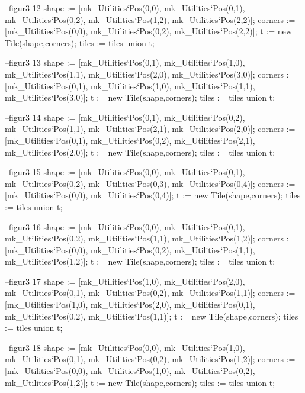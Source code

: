 \begin{vdm_al}
            --figur3 12
            shape := [mk_Utilities`Pos(0,0), mk_Utilities`Pos(0,1), mk_Utilities`Pos(0,2), mk_Utilities`Pos(1,2), mk_Utilities`Pos(2,2)];
            corners := [mk_Utilities`Pos(0,0), mk_Utilities`Pos(0,2), mk_Utilities`Pos(2,2)];
            t := new Tile(shape,corners); 
            tiles := tiles union {t};
            
            --figur3 13
            shape := [mk_Utilities`Pos(0,1), mk_Utilities`Pos(1,0), mk_Utilities`Pos(1,1), mk_Utilities`Pos(2,0), mk_Utilities`Pos(3,0)];
            corners := [mk_Utilities`Pos(0,1), mk_Utilities`Pos(1,0), mk_Utilities`Pos(1,1), mk_Utilities`Pos(3,0)];
            t := new Tile(shape,corners); 
            tiles := tiles union {t};
            
            --figur3 14
            shape := [mk_Utilities`Pos(0,1), mk_Utilities`Pos(0,2), mk_Utilities`Pos(1,1), mk_Utilities`Pos(2,1), mk_Utilities`Pos(2,0)];
            corners := [mk_Utilities`Pos(0,1), mk_Utilities`Pos(0,2), mk_Utilities`Pos(2,1), mk_Utilities`Pos(2,0)];
            t := new Tile(shape,corners); 
            tiles := tiles union {t};
            
            --figur3 15
            shape := [mk_Utilities`Pos(0,0), mk_Utilities`Pos(0,1), mk_Utilities`Pos(0,2), mk_Utilities`Pos(0,3), mk_Utilities`Pos(0,4)];
            corners := [mk_Utilities`Pos(0,0), mk_Utilities`Pos(0,4)];
            t := new Tile(shape,corners); 
            tiles := tiles union {t};
            
            --figur3 16
            shape := [mk_Utilities`Pos(0,0), mk_Utilities`Pos(0,1), mk_Utilities`Pos(0,2), mk_Utilities`Pos(1,1), mk_Utilities`Pos(1,2)];
            corners := [mk_Utilities`Pos(0,0), mk_Utilities`Pos(0,2), mk_Utilities`Pos(1,1), mk_Utilities`Pos(1,2)];
            t := new Tile(shape,corners); 
            tiles := tiles union {t};
            
            --figur3 17
            shape := [mk_Utilities`Pos(1,0), mk_Utilities`Pos(2,0), mk_Utilities`Pos(0,1), mk_Utilities`Pos(0,2), mk_Utilities`Pos(1,1)];
            corners := [mk_Utilities`Pos(1,0), mk_Utilities`Pos(2,0), mk_Utilities`Pos(0,1), mk_Utilities`Pos(0,2), mk_Utilities`Pos(1,1)];
            t := new Tile(shape,corners); 
            tiles := tiles union {t};
            
            --figur3 18
            shape := [mk_Utilities`Pos(0,0), mk_Utilities`Pos(1,0), mk_Utilities`Pos(0,1), mk_Utilities`Pos(0,2), mk_Utilities`Pos(1,2)];
            corners := [mk_Utilities`Pos(0,0), mk_Utilities`Pos(1,0), mk_Utilities`Pos(0,2), mk_Utilities`Pos(1,2)];
            t := new Tile(shape,corners); 
            tiles := tiles union {t};
            

\end{vdm_al}
